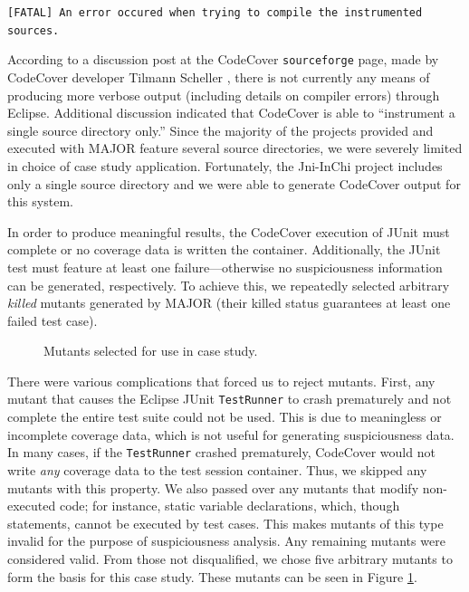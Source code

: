\vspace{5mm}
\texttt{[FATAL] An error occured when trying to compile the instrumented sources.}
\vspace{2mm}

According to a discussion post at the CodeCover \texttt{sourceforge}
page, made by CodeCover developer Tilmann Scheller \cite{discpost}, there is not currently any 
means of producing more verbose output (including details on compiler errors) through Eclipse.  
Additional discussion indicated that CodeCover is able to ``instrument
a single source directory only.''  Since the majority of the projects provided and executed with MAJOR
feature several source directories, we were severely limited in choice of case study application.  
Fortunately, the Jni-InChi project includes only a single source directory and we were able
to generate CodeCover output for this system.

In order to produce meaningful results, the CodeCover execution of JUnit must complete or no coverage
data is written the container.  Additionally, the JUnit test must
feature at least one failure---otherwise no
suspiciousness information can be generated, respectively.  To achieve this, we repeatedly selected
arbitrary \textit{killed} mutants generated by MAJOR (their killed status guarantees at least one failed
test case).  

\begin{figure}[tb]

\caption{Mutants selected for use in case study.}
\label{fig:mutants}
\end{figure}

There were various complications that forced us to reject mutants.  First, any mutant that
causes the Eclipse JUnit \texttt{TestRunner} to crash prematurely and not complete the entire test 
suite could not be used.  This is due to meaningless or incomplete coverage data, which is not useful
for generating suspiciousness data.  In many cases, if the \texttt{TestRunner} crashed prematurely,
CodeCover would not write \emph{any} coverage data to the test session container.  Thus, we skipped
any mutants with this property. We also passed over any mutants that modify non-executed code; for instance, static variable declarations, which, though statements, cannot be executed by test cases.  
This makes mutants of this type invalid for the purpose of suspiciousness analysis.  Any remaining
mutants were considered valid.  From those not disqualified, we chose five arbitrary mutants to 
form the basis for this case study.   These mutants can be seen in Figure \ref{fig:mutants}.

